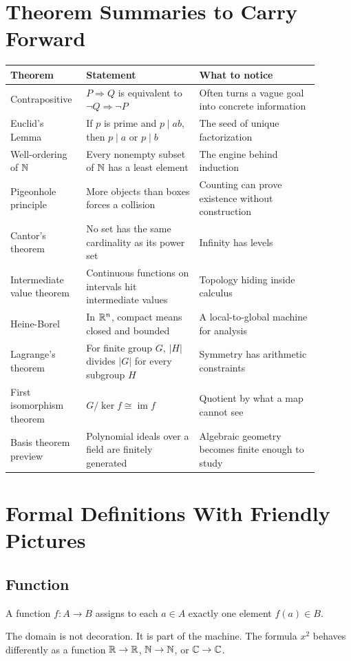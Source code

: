 \documentclass[11pt]{article}
\begin{document}
\section{Theorem Summaries to Carry Forward}

\begin{longtable}{p{0.19\linewidth}p{0.34\linewidth}p{0.36\linewidth}}
\toprule
Theorem & Statement & What to notice \\
\midrule
Contrapositive & $P\Rightarrow Q$ is equivalent to $\neg Q\Rightarrow\neg P$ & Often turns a vague goal into concrete information \\
Euclid's Lemma & If $p$ is prime and $p\mid ab$, then $p\mid a$ or $p\mid b$ & The seed of unique factorization \\
Well-ordering of $\mathbb{N}$ & Every nonempty subset of $\mathbb{N}$ has a least element & The engine behind induction \\
Pigeonhole principle & More objects than boxes forces a collision & Counting can prove existence without construction \\
Cantor's theorem & No set has the same cardinality as its power set & Infinity has levels \\
Intermediate value theorem & Continuous functions on intervals hit intermediate values & Topology hiding inside calculus \\
Heine-Borel & In $\mathbb{R}^n$, compact means closed and bounded & A local-to-global machine for analysis \\
Lagrange's theorem & For finite group $G$, $|H|$ divides $|G|$ for every subgroup $H$ & Symmetry has arithmetic constraints \\
First isomorphism theorem & $G/\ker f\cong \operatorname{im} f$ & Quotient by what a map cannot see \\
Basis theorem preview & Polynomial ideals over a field are finitely generated & Algebraic geometry becomes finite enough to study \\
\bottomrule
\end{longtable}

\section{Formal Definitions With Friendly Pictures}

\subsection{Function}
\begin{formalbox}
A function $f:A\to B$ assigns to each $a\in A$ exactly one element $f(a)\in B$.
\end{formalbox}
\begin{intuitionbox}
The domain is not decoration. It is part of the machine. The formula $x^2$ behaves differently as a function $\mathbb{R}\to\mathbb{R}$, $\mathbb{N}\to\mathbb{N}$, or $\mathbb{C}\to\mathbb{C}$.
\end{intuitionbox}
\end{document}
